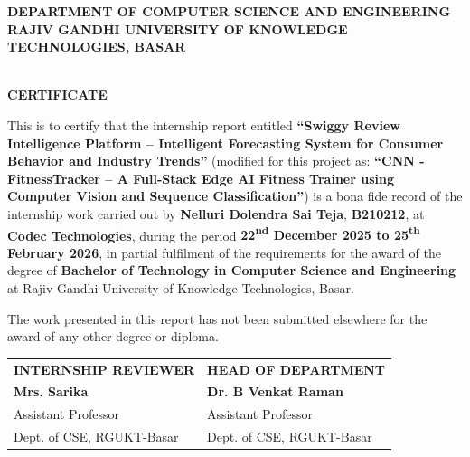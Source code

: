 \documentclass[12pt,a4paper]{report}
\begin{document}
\newpage
{}
\setcounter{page}{3}
\begin{center}
{\large\bfseries DEPARTMENT OF COMPUTER SCIENCE AND ENGINEERING} \\[0.15cm]
{\large\bfseries RAJIV GANDHI UNIVERSITY OF KNOWLEDGE TECHNOLOGIES, BASAR} \\[0.8cm]
 \\[0.8cm]
{\Large\bfseries CERTIFICATE} \\[1.0cm]
\end{center}

This is to certify that the internship report entitled \textbf{``Swiggy Review Intelligence Platform -- Intelligent Forecasting System for Consumer Behavior and Industry Trends''} (modified for this project as: \textbf{``CNN - FitnessTracker -- A Full-Stack Edge AI Fitness Trainer using Computer Vision and Sequence Classification''}) is a bona fide record of the internship work carried out by \textbf{Nelluri Dolendra Sai Teja}, \textbf{B210212}, at \textbf{Codec Technologies}, during the period \textbf{22\textsuperscript{nd} December 2025 to 25\textsuperscript{th} February 2026}, in partial fulfilment of the requirements for the award of the degree of \textbf{Bachelor of Technology in Computer Science and Engineering} at Rajiv Gandhi University of Knowledge Technologies, Basar.

The work presented in this report has not been submitted elsewhere for the award of any other degree or diploma. \\[2.5cm]

\noindent
\begin{tabular}{p{7.5cm} p{7.5cm}}
\textbf{INTERNSHIP REVIEWER} & \textbf{HEAD OF DEPARTMENT} \\[0.8cm]
\textbf{Mrs. Sarika} & \textbf{Dr. B Venkat Raman} \\
Assistant Professor & Assistant Professor \\
Dept. of CSE, RGUKT-Basar & Dept. of CSE, RGUKT-Basar
\end{tabular}
\end{document}
